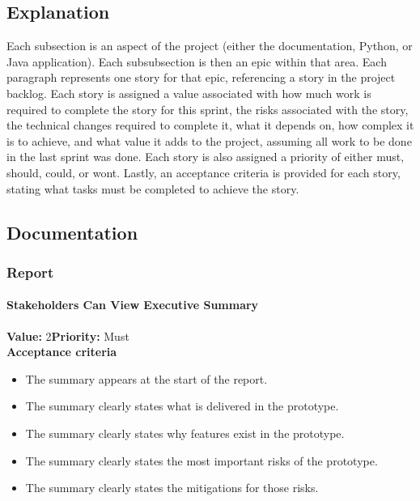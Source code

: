 \subsection{Explanation}
Each subsection is an aspect of the project (either the documentation, Python, or Java application). Each subsubsection is then an epic within that area. Each paragraph represents one story for that epic, referencing a story in the project backlog. Each story is assigned a value associated with how much work is required to complete the story for this sprint, the risks associated with the story, the technical changes required to complete it, what it depends on, how complex it is to achieve, and what value it adds to the project, assuming all work to be done in the last sprint was done. Each story is also assigned a priority of either must, should, could, or wont. Lastly, an acceptance criteria is provided for each story, stating what tasks must be completed to achieve the story.

\subsection{Documentation}

\subsubsection{Report}

\paragraph{Stakeholders Can View Executive Summary}
\textbf{Value:} 2\quad \textbf{Priority:} Must\\
\textbf{Acceptance criteria}
\begin{itemize}
  \item The summary appears at the start of the report.
  \item The summary clearly states what is delivered in the prototype.
  \item The summary clearly states why features exist in the prototype.
  \item The summary clearly states the most important risks of the prototype.
  \item The summary clearly states the mitigations for those risks.
\end{itemize}

